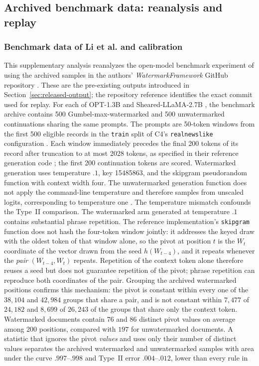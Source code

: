 \documentclass[11pt]{article}
\begin{document}
\FloatBarrier
\subsection{Archived benchmark data: reanalysis and replay}
\label{sec:released-analysis}

\subsubsection{Benchmark data of Li et al. and calibration}
\label{sec:released-calibration}

This supplementary analysis reanalyzes the open-model benchmark experiment of \citet{li2025framework} using the archived samples in the authors' \emph{WatermarkFramework} GitHub repository \citep{li2024watermarkframework}.  These are the pre-existing outputs introduced in Section~\ref{sec:released-output}; the repository reference identifies the exact commit used for replay.  For each of OPT-1.3B \citep{zhang2022opt} and Sheared-LLaMA-2.7B \citep{xia2023sheared}, the benchmark archive contains 500 Gumbel-max-watermarked and 500 unwatermarked continuations sharing the same prompts.  The prompts are 50-token windows from the first 500 eligible records in the \texttt{train} split of C4's \texttt{realnewslike} configuration \citep{raffel2020exploring}.  Each window immediately precedes the final 200 tokens of its record after truncation to at most 2028 tokens, as specified in their reference generation code \citep{li2024watermarkframework}; the first 200 continuation tokens are scored.  Watermarked generation uses temperature $.1$, key 15485863, and the skipgram pseudorandom function with context width four.  The unwatermarked generation function does not apply the command-line temperature and therefore samples from unscaled logits, corresponding to temperature one \citep{li2024watermarkframework}.  The temperature mismatch confounds the Type~II comparison.  The watermarked arm generated at temperature $.1$ contains substantial phrase repetition.  The reference implementation's \texttt{skipgram} function does not hash the four-token window jointly: it addresses the keyed draw with the oldest token of that window alone, so the pivot at position $t$ is the $W_t$ coordinate of the vector drawn from the seed $h(W_{t-4})$, and it repeats whenever the \emph{pair} $(W_{t-4},W_t)$ repeats.  Repetition of the context token alone therefore reuses a seed but does not guarantee repetition of the pivot; phrase repetition can reproduce both coordinates of the pair.  Grouping the archived watermarked positions confirms this mechanism: the pivot is constant within every one of the $38{,}104$ and $42{,}984$ groups that share a pair, and is not constant within $7{,}477$ of $24{,}182$ and $8{,}699$ of $26{,}243$ of the groups that share only the context token.  Watermarked documents contain $76$ and $86$ distinct pivot values on average among 200 positions, compared with $197$ for unwatermarked documents.  A statistic that ignores the pivot \emph{values} and uses only their number of distinct values separates the archived watermarked and unwatermarked samples with area under the curve $.997$--$.998$ and Type~II error $.004$--$.012$, lower than every rule in 
\end{document}
